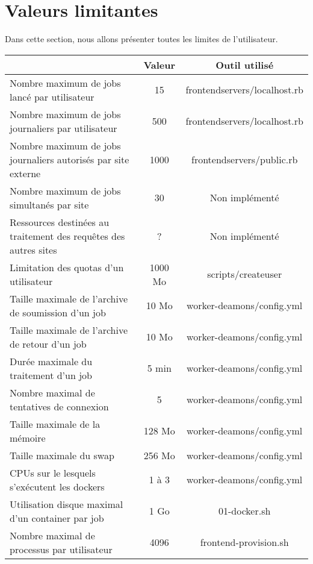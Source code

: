 \section{Valeurs limitantes}

Dans cette section, nous allons présenter toutes les limites de l'utilisateur.


\begin{center}
	\begin{tabular}{| L{8cm} | c | c |}
		\hline
		  & {\bf Valeur} & {\bf Outil utilisé} \\ \hline
		Nombre maximum de jobs lancé par utilisateur & 15 & frontendservers/localhost.rb \\ \hline
		Nombre maximum de jobs journaliers par utilisateur & 500 & frontendservers/localhost.rb \\ \hline
		Nombre maximum de jobs journaliers autorisés par site externe & 1000 & frontendservers/public.rb \\ \hline
		Nombre maximum de jobs simultanés par site & 30 & Non implémenté \\ \hline
		Ressources destinées au traitement des requêtes des autres sites & ? & Non implémenté \\ \hline
		Limitation des quotas d'un utilisateur & 1000 Mo & scripts/createuser \\ \hline
		Taille maximale de l'archive de soumission d'un job & 10 Mo & worker-deamons/config.yml \\ \hline
		Taille maximale de l'archive de retour d'un job & 10 Mo & worker-deamons/config.yml \\ \hline
		Durée maximale du traitement d'un job & 5 min & worker-deamons/config.yml \\ \hline
		Nombre maximal de tentatives de connexion & 5 & worker-deamons/config.yml \\ \hline
		Taille maximale de la mémoire & 128 Mo & worker-deamons/config.yml \\ \hline
		Taille maximale du swap & 256 Mo & worker-deamons/config.yml \\ \hline
		CPUs sur le lesquels s'exécutent les dockers & 1 à 3 & worker-deamons/config.yml \\ \hline
		Utilisation disque maximal d'un container par job & 1 Go & 01-docker.sh \\ \hline
		Nombre maximal de processus par utilisateur & 4096 & frontend-provision.sh \\ \hline
	\end{tabular}
\end{center}

